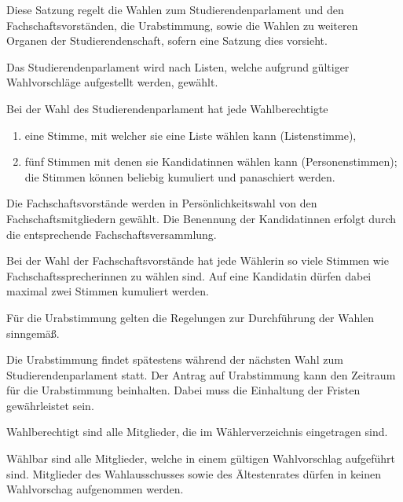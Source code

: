 
\begin{jurdoc}

\label{wahl:geltungsbereich}
Diese Satzung regelt die Wahlen zum Studierendenparlament und den Fachschaftsvorständen, die Urabstimmung, sowie die Wahlen zu weiteren Organen der Studierendenschaft, sofern eine Satzung dies vorsieht.

\label{wahl:wahlsystem}
Das Studierendenparlament wird nach Listen, welche aufgrund gültiger Wahlvorschläge aufgestellt werden, gewählt. 

Bei der Wahl des Studierendenparlament hat jede Wahlberechtigte
\begin{enumerate}
    \item eine Stimme, mit welcher sie eine Liste wählen kann (Listenstimme),
    \item fünf Stimmen mit denen sie Kandidatinnen wählen kann (Personenstimmen); die Stimmen können beliebig kumuliert und panaschiert werden.
\end{enumerate}

Die Fachschaftsvorstände werden in Persönlichkeitswahl von den Fachschaftsmitgliedern gewählt. Die Benennung der Kandidatinnen erfolgt durch die entsprechende Fachschaftsversammlung.

Bei der Wahl der Fachschaftsvorstände hat jede Wählerin so viele Stimmen wie Fachschaftssprecherinnen zu wählen sind. Auf eine Kandidatin dürfen dabei maximal zwei Stimmen kumuliert werden.

\label{wahl:urabstimmung}
Für die Urabstimmung gelten die Regelungen zur Durchführung der Wahlen sinngemäß. 

Die Urabstimmung findet spätestens während der nächsten Wahl zum Studierendenparlament statt. Der Antrag auf Urabstimmung kann den Zeitraum für die Urabstimmung beinhalten. Dabei muss die Einhaltung der Fristen gewährleistet sein.

\label{wahl:wahlberechtigung}

Wahlberechtigt sind alle Mitglieder, die im Wählerverzeichnis eingetragen sind.

Wählbar sind alle Mitglieder, welche in einem gültigen Wahlvorschlag aufgeführt sind. Mitglieder des Wahlausschusses sowie des Ältestenrates dürfen in keinen Wahlvorschag aufgenommen werden.


\end{jurdoc}
